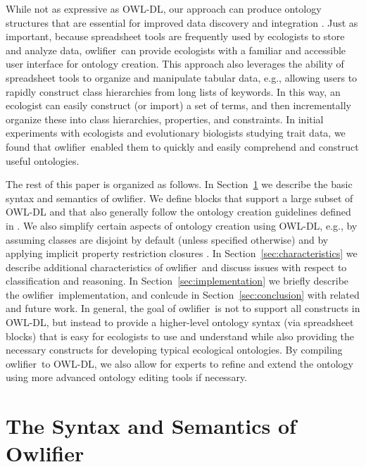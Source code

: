 \documentclass[preprint,number]{elsarticle}
\newcommand{\Owlifier}{\textsf{Owlifier}}
\newcommand{\owlifier}{\textsf{owlifier}}
\newcommand{\secref}[1]{Section~\ref{#1}}
\begin{document}
While not as expressive as OWL-DL, our approach can produce ontology
structures that are essential for improved data discovery and
integration \cite{madin07:_ontol_for_descr_and_synth}. Just as
important, because spreadsheet tools are frequently used by ecologists
to store and analyze data, \owlifier\ can provide ecologists with a
familiar and accessible user interface for ontology creation. This
approach also leverages the ability of spreadsheet tools to organize
and manipulate tabular data, e.g., allowing users to rapidly construct
class hierarchies from long lists of keywords.  In this way, an
ecologist can easily construct (or import) a set of terms, and then
incrementally organize these into class hierarchies, properties, and
constraints. In initial experiments with ecologists and evolutionary
biologists studying trait data, we found that \owlifier\ enabled them
to quickly and easily comprehend and construct useful ontologies.

The rest of this paper is organized as follows. In
\secref{sec:owlifier} we describe the basic syntax and semantics of
\owlifier. We define blocks that support a large subset of OWL-DL and
that also generally follow the ontology creation guidelines defined in
\cite{rector04:_owl_pizzas}. We also simplify certain aspects of
ontology creation using OWL-DL, e.g., by assuming classes are disjoint
by default (unless specified otherwise) and by applying implicit
property restriction closures \cite{rector04:_owl_pizzas}. In
\secref{sec:characteristics} we describe additional characteristics of
\owlifier\ and discuss issues with respect to classification and
reasoning. In \secref{sec:implementation} we briefly describe the
\owlifier\ implementation, and conlcude in \secref{sec:conclusion}
with related and future work. In general, the goal of \owlifier\ is
not to support all constructs in OWL-DL, but instead to provide a
higher-level ontology syntax (via spreadsheet blocks) that is easy for
ecologists to use and understand while also providing the necessary
constructs for developing typical ecological ontologies. By compiling
\owlifier\ to OWL-DL, we also allow for experts to refine and extend
the ontology using more advanced ontology editing tools if necessary.



\section{The Syntax and Semantics of \Owlifier}
\label{sec:owlifier}
\end{document}
